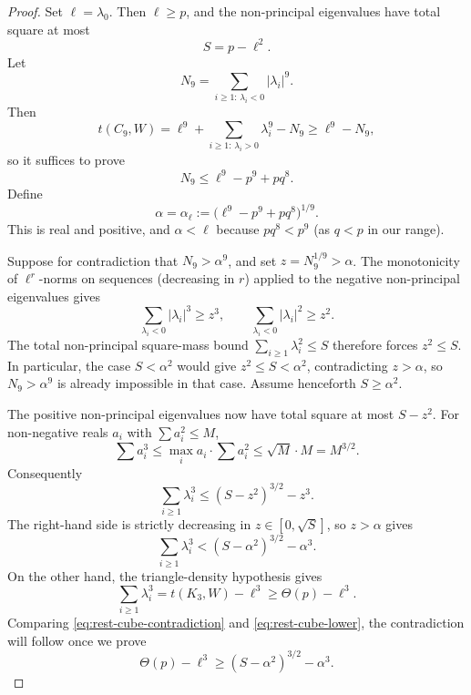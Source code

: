 \documentclass[11pt]{article}
\begin{document}
\begin{proof}
Set $\ell=\lambda_0$.  Then $\ell\ge p$, and the non-principal eigenvalues have total square at most
\[
        S=p-\ell^2.
\]
Let
\[
        N_9=\sum_{i\ge1:\,\lambda_i<0}|\lambda_i|^9.
\]
Then
\[
        t(C_9,W)=\ell^9+\sum_{i\ge1:\,\lambda_i>0}\lambda_i^9-N_9
        \ge \ell^9-N_9,
\]
so it suffices to prove
\begin{equation}\label{eq:N9-target}
        N_9\le \ell^9-p^9+pq^8.
\end{equation}
Define
\[
        \alpha=\alpha_\ell:=\bigl(\ell^9-p^9+pq^8\bigr)^{1/9}.
\]
This is real and positive, and $\alpha<\ell$ because $pq^8<p^9$ (as $q<p$ in our range).

Suppose for contradiction that $N_9>\alpha^9$, and set $z=N_9^{1/9}>\alpha$.  The monotonicity of $\ell^r$-norms on sequences (decreasing in $r$) applied to the negative non-principal eigenvalues gives
\[
        \sum_{\lambda_i<0}|\lambda_i|^3\ge z^3,
        \qquad
        \sum_{\lambda_i<0}|\lambda_i|^2\ge z^2.
\]
The total non-principal square-mass bound $\sum_{i\ge1}\lambda_i^2\le S$ therefore forces $z^2\le S$.  In particular, the case $S<\alpha^2$ would give $z^2\le S<\alpha^2$, contradicting $z>\alpha$, so $N_9>\alpha^9$ is already impossible in that case.  Assume henceforth $S\ge\alpha^2$.

The positive non-principal eigenvalues now have total square at most $S-z^2$.  For non-negative reals $a_i$ with $\sum a_i^2\le M$,
\[
        \sum a_i^3
        \le \max_i a_i\cdot \sum a_i^2
        \le \sqrt M\cdot M=M^{3/2}.
\]
Consequently
\begin{equation}\label{eq:rest-cube-upper}
        \sum_{i\ge1}\lambda_i^3
        \le (S-z^2)^{3/2}-z^3.
\end{equation}
The right-hand side is strictly decreasing in $z\in[0,\sqrt S]$, so $z>\alpha$ gives
\begin{equation}\label{eq:rest-cube-contradiction}
        \sum_{i\ge1}\lambda_i^3
        < (S-\alpha^2)^{3/2}-\alpha^3.
\end{equation}
On the other hand, the triangle-density hypothesis gives
\begin{equation}\label{eq:rest-cube-lower}
        \sum_{i\ge1}\lambda_i^3
        =t(K_3,W)-\ell^3
        \ge \Theta(p)-\ell^3.
\end{equation}
Comparing \eqref{eq:rest-cube-contradiction} and \eqref{eq:rest-cube-lower}, the contradiction will follow once we prove
\begin{equation}\label{eq:key-ell}
        \Theta(p)-\ell^3\ge (S-\alpha^2)^{3/2}-\alpha^3.
\end{equation}


\end{proof}
\end{document}
